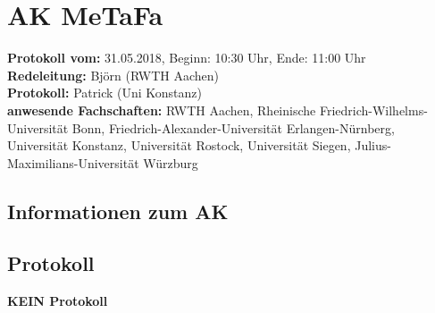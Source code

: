 
\section{AK MeTaFa}

	\textbf{Protokoll vom:} 31.05.2018,
	Beginn: 10:30 Uhr,
	Ende: 11:00 Uhr \\
	\textbf{Redeleitung:} Björn (RWTH Aachen) \\
	\textbf{Protokoll:} Patrick (Uni Konstanz) \\
	\textbf{anwesende Fachschaften:} RWTH Aachen, Rheinische Friedrich-Wilhelms-Universität Bonn, Friedrich-Alexander-Universität Erlangen-Nürnberg, Universität Konstanz, Universität Rostock, Universität Siegen, Julius-Maximilians-Universität Würzburg

	\subsection*{Informationen zum AK}

  \subsection*{Protokoll}
    \textbf{KEIN Protokoll}
